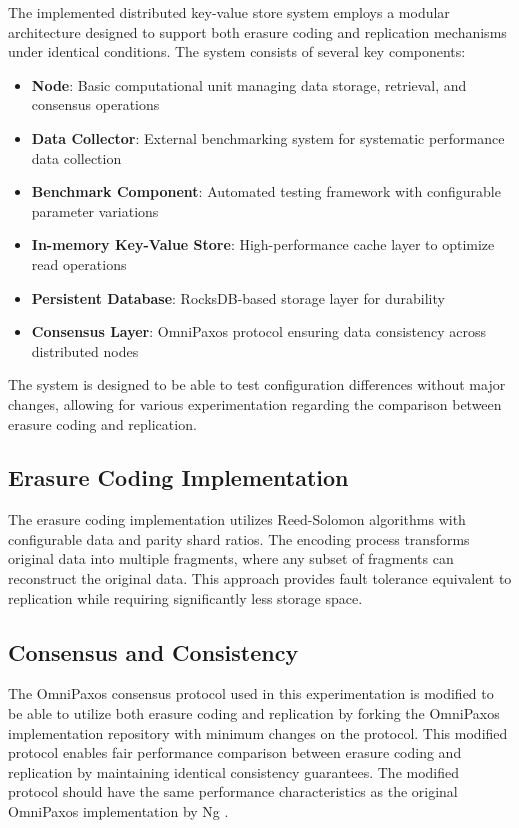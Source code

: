The implemented distributed key-value store system employs a modular architecture designed to support both erasure coding and replication mechanisms under identical conditions. The system consists of several key components:

\begin{itemize}
\item \textbf{Node}: Basic computational unit managing data storage, retrieval, and consensus operations
\item \textbf{Data Collector}: External benchmarking system for systematic performance data collection
\item \textbf{Benchmark Component}: Automated testing framework with configurable parameter variations
\item \textbf{In-memory Key-Value Store}: High-performance cache layer to optimize read operations
\item \textbf{Persistent Database}: RocksDB-based storage layer for durability
\item \textbf{Consensus Layer}: OmniPaxos protocol ensuring data consistency across distributed nodes
\end{itemize}

The system is designed to be able to test configuration differences without major changes, allowing for various experimentation regarding the comparison between erasure coding and replication.

\subsection{Erasure Coding Implementation}

The erasure coding implementation utilizes Reed-Solomon algorithms with configurable data and parity shard ratios. The encoding process transforms original data into multiple fragments, where any subset of fragments can reconstruct the original data. This approach provides fault tolerance equivalent to replication while requiring significantly less storage space.

\subsection{Consensus and Consistency}

The OmniPaxos consensus protocol used in this experimentation is modified to be able to utilize both erasure coding and replication by forking the OmniPaxos implementation repository with minimum changes on the protocol. This modified protocol enables fair performance comparison between erasure coding and replication by maintaining identical consistency guarantees. The modified protocol should have the same performance characteristics as the original OmniPaxos implementation by Ng \cite{ng2023omni}.


